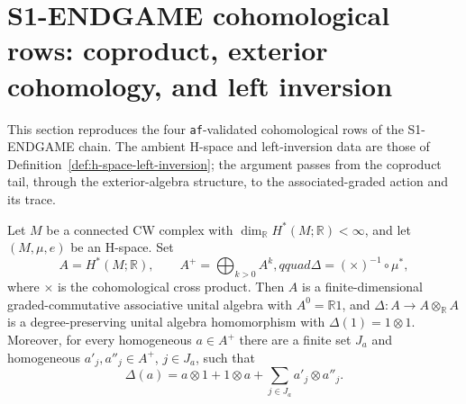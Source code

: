 \section{S1-ENDGAME cohomological rows: coproduct, exterior cohomology, and left inversion}\label{sec:stage1-endgame-cohomology}

This section reproduces the four \texttt{af}-validated cohomological rows of the
S1-ENDGAME chain.  The ambient H-space and left-inversion data are those of
Definition~\ref{def:h-space-left-inversion}; the argument passes from the coproduct tail,
through the exterior-algebra structure, to the associated-graded action and its trace.

\begin{lemma}\label{lem:stage1-hspace-coproduct-tail}
Let $M$ be a connected CW complex with $\dim_{\mathbb R}H^*(M;\mathbb R)<\infty$, and let
$(M,\mu,e)$ be an H-space.  Set
\[
 A=H^*(M;\mathbb R),\qquad A^+=\bigoplus_{k>0}A^k,qquad
 \Delta=({\times})^{-1}\circ\mu^*,
\]
where $\times$ is the cohomological cross product.  Then $A$ is a finite-dimensional
graded-commutative associative unital algebra with $A^0=\mathbb R1$, and
$\Delta:A\to A\otimes_{\mathbb R}A$ is a degree-preserving unital algebra homomorphism
with $\Delta(1)=1\otimes1$.  Moreover, for every homogeneous $a\in A^+$ there are a
finite set $J_a$ and homogeneous $a'_j,a''_j\in A^+$, $j\in J_a$, such that
\[
 \Delta(a)=a\otimes1+1\otimes a+\sum_{j\in J_a}a'_j\otimes a''_j.
\]
\end{lemma}

